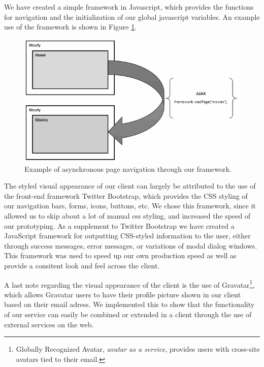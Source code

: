 We have created a simple framework in Javascript, which provides the functions for navigation and the initialization of our global javascript variables. An example use of the framework is shown in Figure \ref{fig:ajax}.

\begin{figure}[hbt]
	\centering
	\centerline{\includegraphics[scale=0.7]{./p1design/ajax.png}}
	\caption{Example of asynchronous page navigation through our framework.}
	\label{fig:ajax}
\end{figure}

The styled visual appearance of our client can largely be attributed to the use of the front-end framework Twitter Bootstrap, which provides the CSS styling of our navigation bars, forms, icons, buttons, etc. We chose this framework, since it allowed us to skip about a lot of manual css styling, and increased the speed of our prototyping. As a supplement to Twitter Bootstrap we have created a JavaScript framework for outputting CSS-styled information to the user, either through success messages, error messages, or variations of modal dialog windows. This framework was used to speed up our own production speed as well as provide a consitent look and feel across the client.

A last note regarding the visual appearance of the client is the use of Gravatar\footnote{Globally Recognized Avatar, \emph{avatar as a service}, provides users with cross-site avatars tied to their email.}, which allows Gravatar users to have their profile picture shown in our client based on their email adress. We implemented this to show that the functionality of our service can easily be combined or extended in a client through the use of external services on the web.